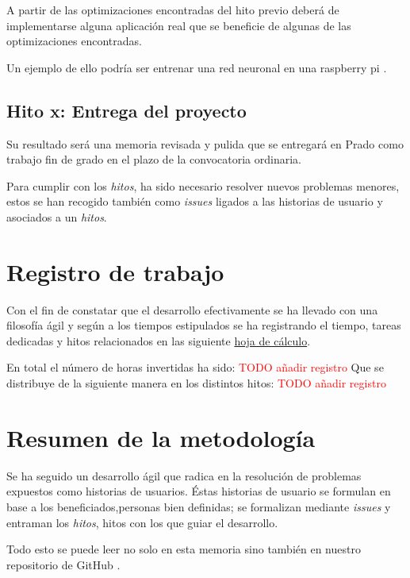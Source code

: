 A partir de las optimizaciones encontradas del hito previo deberá de implementarse alguna aplicación real que se beneficie de algunas de las optimizaciones encontradas. 

Un ejemplo de ello podría ser entrenar una red neuronal en una raspberry pi .



\subsection*{Hito x: Entrega del proyecto}

Su resultado será una memoria revisada y pulida que se entregará en Prado como trabajo fin de grado en el plazo de la convocatoria ordinaria. 

Para cumplir con los \textit{hitos},  ha sido necesario resolver nuevos  problemas menores, estos se han
recogido también como \textit{issues} ligados a las historias de usuario y asociados a un  \textit{hitos}.

\section{Registro de trabajo}  

Con el fin de constatar que el desarrollo efectivamente se ha 
llevado con una filosofía ágil y según a los tiempos estipulados se ha registrando el tiempo, tareas dedicadas  y hitos relacionados
en las siguiente \href{https://docs.google.com/spreadsheets/d/1TCcKQIKjKW9sMSU2f6obN9gHgv3c8UEdjmONkBlv42M/edit?usp=sharing}{hoja de cálculo}.

En total el número de horas invertidas ha sido: 
\textcolor{red}{TODO añadir registro}
Que se distribuye de la siguiente manera en los distintos hitos: 
\textcolor{red}{TODO añadir registro}


\section{Resumen de la metodología}  

Se ha seguido un desarrollo ágil que radica en la resolución de problemas expuestos como historias de usuarios. 
Éstas historias de usuario se formulan en base a los beneficiados,personas bien definidas; se formalizan 
mediante \textit{issues} y entraman los \textit{hitos}, hitos con los que guiar el desarrollo.

Todo esto se puede leer no solo en esta memoria sino también en nuestro repositorio de GitHub \cite{TFG-Estudio-de-las-redes-neuronales}. 
 




